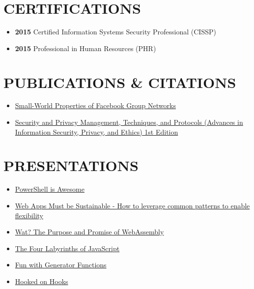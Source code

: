 \documentclass[10pt]{article}
\def\tightlist{}
\begin{document}
\hypertarget{certifications}{%
\section{CERTIFICATIONS}\label{certifications}}

\begin{itemize}
\tightlist
\item
  \textbf{2015} Certified Information Systems Security Professional
  (CISSP)
\item
  \textbf{2015} Professional in Human Resources (PHR)
\end{itemize}

\hypertarget{publications-citations}{%
\section{PUBLICATIONS \& CITATIONS}\label{publications-citations}}

\begin{itemize}
\tightlist
\item
  \href{http://wpmedia.wolfram.com/uploads/sites/13/2018/02/23-3-1.pdf}{Small-World
  Properties of Facebook Group Networks}
\item
  \href{https://smile.amazon.com/gp/product/1522555838/ref=ppx_yo_dt_b_asin_title_o02_s00?ie=UTF8\&psc=1}{Security
  and Privacy Management, Techniques, and Protocols (Advances in
  Information Security, Privacy, and Ethics) 1st Edition}
\end{itemize}

\hypertarget{presentations}{%
\section{PRESENTATIONS}\label{presentations}}

\begin{itemize}
\tightlist
\item
  \href{https://powershell.surge.sh/}{PowerShell is Awesome}
\item
  \href{http://sustainable.surge.sh/}{Web Apps Must be Sustainable - How
  to leverage common patterns to enable flexibility}
\item
  \href{http://wat-brown-bag.surge.sh/}{Wat? The Purpose and Promise of
  WebAssembly}
\item
  \href{http://www.jasonwohlgemuth.com/slides-javascript-labyrinths/\#/title}{The
  Four Labyrinths of JavaScript}
\item
  \href{https://generators.surge.sh/}{Fun with Generator Functions}
\item
  \href{http://hooked-on-hooks.surge.sh/}{Hooked on Hooks}
\end{itemize}
\end{document}
